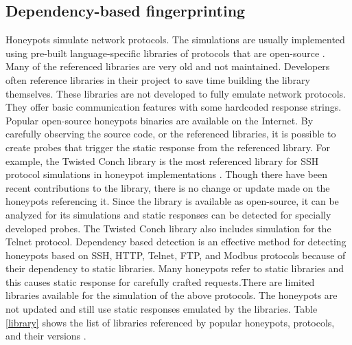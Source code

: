 
\subsection{Dependency-based fingerprinting}
Honeypots simulate network protocols. The simulations are usually implemented using pre-built language-specific libraries of protocols that are open-source \cite{Vetterl2018}. Many of the referenced libraries are very old and not maintained. Developers often reference libraries in their project to save time building the library themselves. These libraries are not developed to fully emulate network protocols. They offer basic communication features with some hardcoded response strings. Popular open-source honeypots binaries are available on the Internet. By carefully observing the source code, or the referenced libraries, it is possible to create probes that trigger the static response from the referenced library. For example, the Twisted Conch  library is the most referenced library for SSH protocol simulations in honeypot implementations\cite{twisted}  \cite{counting} . Though there have been recent contributions to the library, there is no change or update made on the honeypots referencing it. Since the library is available as open-source, it can be analyzed for its simulations and static responses can be detected for specially developed probes. The Twisted Conch library also includes simulation for the Telnet protocol. Dependency based detection is an effective method for detecting honeypots based on SSH, HTTP, Telnet, FTP, and Modbus protocols because of their dependency to static libraries. Many honeypots refer to static libraries and this causes static response for carefully crafted requests.There are limited libraries available for the simulation of the above protocols. The honeypots are not updated and still use static responses emulated by the libraries. Table \ref{library}  shows the list of libraries referenced by popular honeypots, protocols, and their versions \cite{Vetterl2018}. 



